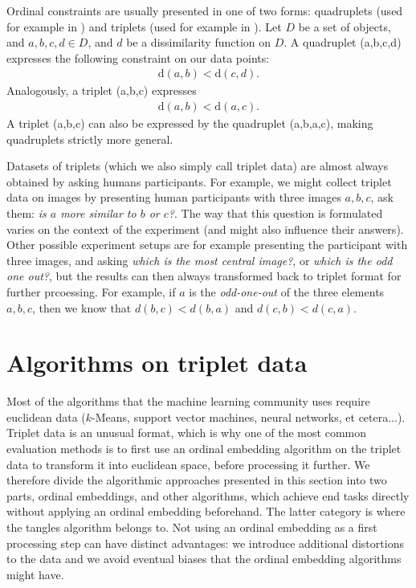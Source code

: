 Ordinal constraints are usually presented in one of two forms: quadruplets (used for example in \cite{ghoshdastidarFoundationsComparisonBasedHierarchical2019}) and triplets (used for example in \cite{vankadaraInsightsOrdinalEmbedding2021,haghiriComparisonBasedFrameworkPsychophysics2019}).
Let $D$ be a set of objects, and $a,b,c,d \in D$, and $d$ be a dissimilarity function on $D$.
A quadruplet (a,b,c,d) expresses the following constraint on our data points: 
\begin{align*}
\text{d}(a,b) < \text{d}(c,d)
.\end{align*}
Analogously, a triplet (a,b,c) expresses 
\begin{align*}
\text{d}(a,b) < \text{d}(a,c) 
.\end{align*}
A triplet (a,b,c) can also be expressed by the quadruplet (a,b,a,c), making quadruplets strictly more general. 

Datasets of triplets (which we also simply call triplet data) are almost always obtained by asking humans participants. For example, we might 
collect triplet data on images by presenting human participants with three images $a,b,c$, 
ask them: \textit{is $a$ more similar to $b$ or $c$?}.
The way that this question is formulated varies on the context of the experiment (and might also influence their answers). 
Other possible experiment setups are for example presenting the participant with three images, and asking \textit{which is the most central image?}, or \textit{which is the odd one out?},
but the results can then always transformed back to triplet format for further prcoessing. 
For example, if $a$ is the \textit{odd-one-out} of the three elements $a,b,c$, 
then we know that $d(b,c) < d(b,a)$ and $d(c, b) < d(c,a)$. 

\section{Algorithms on triplet data}
Most of the algorithms that the machine learning community uses require euclidean data 
($k$-Means, support vector machines, neural networks, et cetera...).
Triplet data is an unusual format, which is why one of the most common evaluation
methods is to first use an ordinal embedding algorithm on the triplet data to transform
it into euclidean space, before processing it further.  
We therefore divide the algorithmic approaches presented in this section into two parts, 
ordinal embeddings, and other algorithms, which achieve
end tasks directly without applying an ordinal embedding beforehand. 
The latter category is where the tangles algorithm belongs to. Not using an ordinal embedding
as a first processing step can have distinct advantages: 
we introduce additional distortions to the data and we avoid eventual biases that the ordinal embedding algorithms might have.


